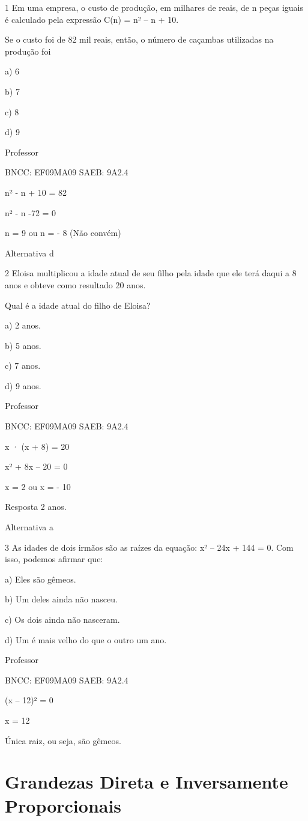 \begin{escolha}
{{{\begin{escolha}
{

\num{1} Em uma empresa, o custo de produção, em milhares de reais, de n peças
iguais é calculado pela expressão C(n) = n² -- n + 10.

Se o custo foi de 82 mil reais, então, o número de caçambas utilizadas
na produção foi

a) 6

b) 7

c) 8

d) 9

Professor

BNCC: EF09MA09 SAEB: 9A2.4

n² - n + 10 = 82

n² - n -72 = 0

n = 9 ou n = - 8 (Não convém)

Alternativa d

\num{2} Eloisa multiplicou a idade atual de seu filho pela idade que ele terá
daqui a 8 anos e obteve como resultado 20 anos.

Qual é a idade atual do filho de Eloisa?

a) 2 anos.

b) 5 anos.

c) 7 anos.

d) 9 anos.

Professor

BNCC: EF09MA09 SAEB: 9A2.4

x · (x + 8) = 20

x² + 8x -- 20 = 0

x = 2 ou x = - 10

Resposta 2 anos.

Alternativa a

\num{3} As idades de dois irmãos são as raízes da equação: x² -- 24x + 144 =
0. Com isso, podemos afirmar que:

a) Eles são gêmeos.

b) Um deles ainda não nasceu.

c) Os dois ainda não nasceram.

d) Um é mais velho do que o outro um ano.

Professor

BNCC: EF09MA09 SAEB: 9A2.4

(x -- 12)² = 0

x = 12

Única raiz, ou seja, são gêmeos.

\pagestyle{mat}
\chapter{Grandezas Direta e Inversamente Proporcionais}

}
\end{escolha}}}}
\end{escolha}
